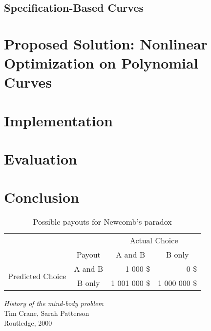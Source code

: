 \documentclass[a4paper]{article}
\begin{document}
		\subsection{Specification-Based Curves}


	\section{Proposed Solution: Nonlinear Optimization on Polynomial Curves}


	\section{Implementation}

	\section{Evaluation}


	\section{Conclusion}

		\begin{table}[htbp]
			\centering
			\begin{tabular}{c|c|r|r|}
				\multicolumn{1}{c}{} & \multicolumn{1}{c}{} & \multicolumn{2}{c}{Actual Choice} \\
				\cline{2-4}
				& Payout & \multicolumn{1}{|c|}{A and B} & \multicolumn{1}{|c|}{B only} \\
				\cline{2-4}
				\multirow{2}{*}{Predicted Choice} & A and B & 1 000 \$ & 0 \$ \\
				\cline{2-4}
				& B only & 1 001 000 \$ & 1 000 000 \$ \\
				\cline{2-4}
			\end{tabular}
			\caption{Possible payouts for Newcomb's paradox}
			\label{table:NewcombParadoxPayouts}
		\end{table}

	\begin{thebibliography}{}

			\emph{History of the mind-body problem}\\
			Tim Crane, Sarah Patterson\\
			Routledge, 2000

	\end{thebibliography}
\end{document}
